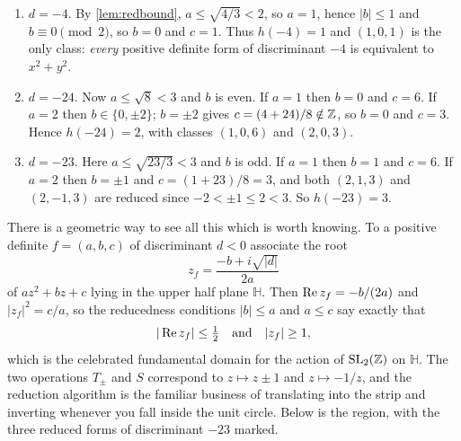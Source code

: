 \documentclass[a4paper]{scrartcl}
\begin{document}
\begin{example}\label{ex:classnumbers}
	\begin{enumerate}[label=(\roman*)]
		\item $d = -4$. By \autoref{lem:redbound}, $a \leq \sqrt{4/3} < 2$, so $a = 1$, hence $|b| \leq 1$ and $b \equiv 0 \pmod 2$, so $b = 0$ and $c = 1$. Thus $h(-4) = 1$ and $(1,0,1)$ is the only class: \emph{every} positive definite form of discriminant $-4$ is equivalent to $x^2 + y^2$.
		\item $d = -24$. Now $a \leq \sqrt 8 < 3$ and $b$ is even. If $a = 1$ then $b = 0$ and $c = 6$. If $a = 2$ then $b \in \{0, \pm2\}$; $b = \pm 2$ gives $c = (4+24)/8 \notin \mathbb{Z}$, so $b = 0$ and $c = 3$. Hence $h(-24) = 2$, with classes $(1,0,6)$ and $(2,0,3)$.
		\item $d = -23$. Here $a \leq \sqrt{23/3} < 3$ and $b$ is odd. If $a = 1$ then $b = 1$ and $c = 6$. If $a = 2$ then $b = \pm 1$ and $c = (1+23)/8 = 3$, and both $(2,1,3)$ and $(2,-1,3)$ are reduced since $-2 < \pm 1 \leq 2 < 3$. So $h(-23) = 3$.
	\end{enumerate}
\end{example}

There is a geometric way to see all this which is worth knowing. To a positive definite $f = (a,b,c)$ of discriminant $d < 0$ associate the root
$$
z_f = \frac{-b + i\sqrt{|d|}}{2a}
$$
of $az^2 + bz + c$ lying in the upper half plane $\mathbb H$. Then $\operatorname{Re} z_f = -b/(2a)$ and $|z_f|^2 = c/a$, so the reducedness conditions $|b| \leq a$ and $a \leq c$ say exactly that
$$
|\operatorname{Re} z_f| \leq \tfrac12 \quad \text{and} \quad |z_f| \geq 1,
$$
which is the celebrated fundamental domain for the action of $\operatorname{SL}_2(\mathbb{Z})$ on $\mathbb H$. The two operations $T_\pm$ and $S$ correspond to $z \mapsto z \pm 1$ and $z \mapsto -1/z$, and the reduction algorithm is the familiar business of translating into the strip and inverting whenever you fall inside the unit circle. Below is the region, with the three reduced forms of discriminant $-23$ marked.
\end{document}
